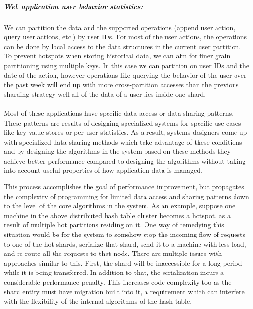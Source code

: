     \subparagraph{Web application user behavior statistics:} We can partition
    the data and the supported operations (append user action,
    query user actions, etc.) by user IDs.
    For most of
    the user actions, the operations can be done by local access to the
    data structures in the current user partition. To prevent hotspots when
    storing historical data, we can aim for finer grain partitioning using
    multiple keys. In this case we can
    partition on user IDs and the date of the action, however operations like
    querying the behavior of the user over the past
    week will end up with more cross-partition accesses than the previous
    sharding strategy well all of the data of a user lies inside one shard.

\paragraph{}
Most of these applications have specific data access or data sharing patterns.
These patterns are results of designing specialized systems for specific
use cases like key value stores or per user statistics.
As a result, systems designers come up with specialized data sharing methods
which take advantage of these conditions and by designing the algorithms
in the system based on these methods they achieve better performance compared
to designing the algorithms without taking into account useful properties of
how application data is managed.

This process accomplishes the goal of performance improvement, but propagates
the complexity of programming for limited data access and sharing patterns
down to the level of the core algorithms in the system. As an example, suppose
one machine in the above distributed hash table cluster becomes a hotspot,
as a result of multiple hot partitions residing on it. One way of
remedying this situation would be for the system to somehow stop the incoming
flow of requests to one of the hot shards, serialize that shard, send it to
a machine with less load, and re-route all the requests to that node. There
are multiple issues with approaches similar to this. First, the shard will be
inaccessible for a long period while it is being transferred. In addition
to that,
the serialization incurs a considerable performance penalty. This increases
code complexity too as the shard entity must have migration built into it,
a requirement which can interfere with the flexibility of the internal
algorithms of the hash table.

